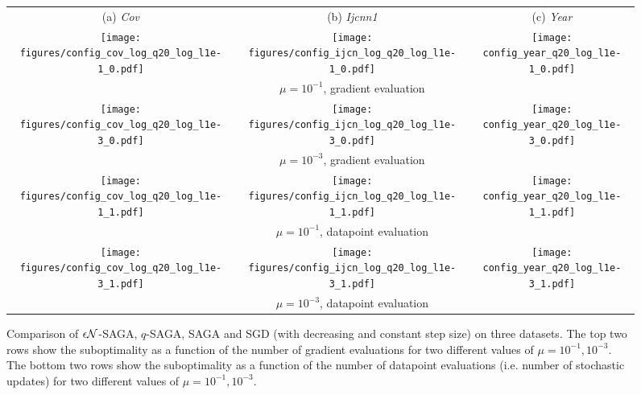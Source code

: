%
%
\begin{figure*}
  \begin{center}
    \begin{tabular}{@{}c@{\hspace{2mm}}c@{\hspace{2mm}}c@{}}
      (a) {\it Cov} &
      (b) {\it Ijcnn1} &
      (c) {\it Year} \\    
      \texttt{[image: figures/config\_cov\_log\_q20\_log\_l1e-1\_0.pdf]} &
      \texttt{[image: figures/config\_ijcn\_log\_q20\_log\_l1e-1\_0.pdf]} &
      \texttt{[image: config\_year\_q20\_log\_l1e-1\_0.pdf]} \\
      & {\scriptsize $\mu=10^{-1}$, gradient evaluation} & \vspace{2mm} \\ 
      \texttt{[image: figures/config\_cov\_log\_q20\_log\_l1e-3\_0.pdf]} &
      \texttt{[image: figures/config\_ijcn\_log\_q20\_log\_l1e-3\_0.pdf]} &
      \texttt{[image: config\_year\_q20\_log\_l1e-3\_0.pdf]} \\
      & {\scriptsize $\mu=10^{-3}$, gradient evaluation} & \vspace{2mm} \\
      \texttt{[image: figures/config\_cov\_log\_q20\_log\_l1e-1\_1.pdf]} &
      \texttt{[image: figures/config\_ijcn\_log\_q20\_log\_l1e-1\_1.pdf]} &
      \texttt{[image: config\_year\_q20\_log\_l1e-1\_1.pdf]} \\
      & {\scriptsize $\mu=10^{-1}$, datapoint evaluation} & \vspace{2mm} \\
      \texttt{[image: figures/config\_cov\_log\_q20\_log\_l1e-3\_1.pdf]} &
      \texttt{[image: figures/config\_ijcn\_log\_q20\_log\_l1e-3\_1.pdf]} &
      \texttt{[image: config\_year\_q20\_log\_l1e-3\_1.pdf]} \\
      & {\scriptsize $\mu=10^{-3}$, datapoint evaluation} & \vspace{2mm} \\
    \end{tabular}
  \vspace{2mm}
  \caption{Comparison of $\epsilon {\cal N}$-SAGA, $q$-SAGA, SAGA and SGD (with decreasing and constant step size) on three datasets. The top two rows show the suboptimality as a function of the number of gradient evaluations for two different values of $\mu=10^{-1}, 10^{-3}$. The bottom two rows show the suboptimality as a function of the number of datapoint evaluations (i.e. number of stochastic updates) for two different values of $\mu=10^{-1}, 10^{-3}$.}
  \label{fig:results}
\end{center}
\end{figure*}
%

